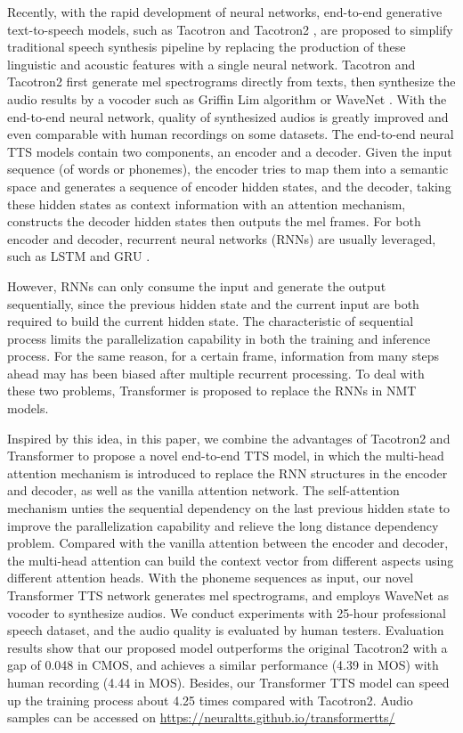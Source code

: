 \documentclass[letterpaper]{article} \usepackage{aaai19}  \usepackage{times}  \usepackage{helvet}  \usepackage{courier}  \usepackage{url}  \usepackage{graphicx}  \frenchspacing
\begin{document}
Recently, with the rapid development of neural networks, end-to-end generative text-to-speech models, such as Tacotron \cite{wang2017tacotron} and Tacotron2 \cite{shen2017natural}, are proposed to simplify traditional speech synthesis pipeline by replacing the production of these linguistic and acoustic features with a single neural network. Tacotron and Tacotron2 first generate mel spectrograms directly from texts, then synthesize the audio results by a vocoder such as Griffin Lim algorithm \cite{griffin1984signal} or WaveNet \cite{van2016wavenet}. With the end-to-end neural network, quality of synthesized audios is greatly improved and even comparable with human recordings on some datasets. The end-to-end neural TTS models contain two components, an encoder and a decoder. Given the input sequence (of words or phonemes), the encoder tries to map them into a semantic space and generates a sequence of encoder hidden states, and the decoder, taking these hidden states as context information with an attention mechanism, constructs the decoder hidden states then outputs the mel frames. For both encoder and decoder, recurrent neural networks (RNNs) are usually leveraged, such as LSTM \cite{hochreiter1997long} and GRU \cite{Cho2014Learning}.

However, RNNs can only consume the input and generate the output sequentially, since the previous hidden state and the current input are both required to build the current hidden state. The characteristic of sequential process limits the parallelization capability in both the training and inference process. For the same reason, for a certain frame, information from many steps ahead may has been biased after multiple recurrent processing. To deal with these two problems, Transformer \cite{vaswani2017attention} is proposed to replace the RNNs in NMT models.

Inspired by this idea, in this paper, we combine the advantages of Tacotron2 and Transformer to propose a novel end-to-end TTS model, in which the multi-head attention mechanism is introduced to replace the RNN structures in the encoder and decoder, as well as the vanilla attention network. The self-attention mechanism unties the sequential dependency on the last previous hidden state to improve the parallelization capability and relieve the long distance dependency problem. Compared with the vanilla attention between the encoder and decoder, the multi-head attention can build the context vector from different aspects using different attention heads. With the phoneme sequences as input, our novel Transformer TTS network generates mel spectrograms, and employs WaveNet as vocoder to synthesize audios. We conduct experiments with 25-hour professional speech dataset, and the audio quality is evaluated by human testers. Evaluation results show that our proposed model outperforms the original Tacotron2 with a gap of 0.048 in CMOS, and achieves a similar performance (4.39 in MOS) with human recording (4.44 in MOS).  Besides, our Transformer TTS model can speed up the training process about 4.25 times compared with Tacotron2.
Audio samples can be accessed on \url{https://neuraltts.github.io/transformertts/}
\end{document}
